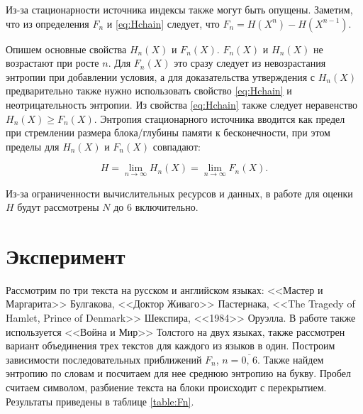 \documentclass[a4paper,12pt]{article}
\begin{document}
	Из-за стационарности источника индексы также могут быть опущены. Заметим, что из определения $ F_n $ и \ref{eq:Hchain} следует, что $ F_n = H(X^n) - H(X^{n-1})$. 
	
	Опишем основные свойства $ H_n(X) $ и $ F_n(X) $.  $ F_n(X) $ и $H_n(X)$ не возрастают при росте $ n $. Для $ F_n(X) $ это сразу следует из невозрастания энтропии при добавлении условия, а для доказательства утверждения с $H_n(X)$ предварительно также нужно использовать свойство \ref{eq:Hchain} и неотрицательность энтропии. Из свойства \ref{eq:Hchain} также следует неравенство $H_n(X) \ge F_n(X) $.
	Энтропия стационарного источника вводится как предел при стремлении размера блока/глубины памяти к бесконечности, при этом пределы для $H_n(X)$ и $ F_n(X) $ совпадают:
	
	\begin{equation}\label{eq:H_inf}
		H = \lim\limits_{n\rightarrow \infty} H_n(X) = \lim\limits_{n\rightarrow \infty} F_n(X).
	\end{equation}

	Из-за ограниченности вычислительных ресурсов и данных, в работе для оценки $ H $ будут рассмотрены $ N $ до 6 включительно.
	
	\section*{Эксперимент}
	
	Рассмотрим по три текста на русском и английском языках: <<Мастер и Маргарита>> Булгакова, <<Доктор Живаго>> Пастернака, <<The Tragedy of Hamlet, Prince of Denmark>> Шекспира, <<1984>> Оруэлла. В работе также используется <<Война и Мир>> Толстого на двух языках, также рассмотрен вариант объединения трех текстов для каждого из языков в один. Построим зависимости последовательных приближений $F_n$, $n=\overline{0,\,6}$. Также найдем энтропию по словам и посчитаем для нее среднюю энтропию на букву. Пробел считаем символом, разбиение текста на блоки происходит с перекрытием. Результаты приведены в таблице \ref{table:Fn}.
	
\end{document}
